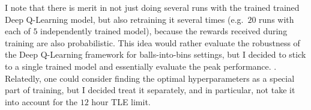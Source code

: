 I note that there is merit in not just doing several runs with the trained trained Deep Q-Learning model, but also retraining it several times (e.g.\ $20$ runs with each of $5$ independently trained model), because the rewards received during training are also probabilistic. This idea would rather evaluate the robustness of the Deep Q-Learning framework for balls-into-bins settings, but I decided to stick to a single trained model and essentially evaluate the peak performance.  . Relatedly, one could consider finding the optimal hyperparameters as a special part of training, but I decided treat it separately, and in particular, not take it into account for the $12$ hour TLE limit.


